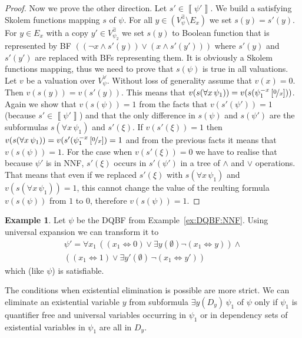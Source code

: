 \documentclass[
  digital, %
  color,
  twoside, %
  table,   %
  nolof,     %
  nolot,     %
]{fithesis3}
\theoremstyle{definition}
\newtheorem{example}{Example}
\theoremstyle{remark}
\newcommand{\seman}[1]{\left\llbracket {#1} \right\rrbracket}
\newcommand{\substitute}[2]{\left[ \nicefrac{#2}{#1} \right]}
\newcommand{\evars}[1]{V_{#1}^{\exists}}
\newcommand{\uvars}[1]{V_{#1}^{\forall}}
\newcommand{\lequal}{\Leftrightarrow}
\newcommand{\itholds}{\,}
\begin{document}
\begin{proof}
  Now we prove the other direction. Let $s' \in \seman{\psi'}$. We build a satisfying Skolem functions mapping $s$ of $\psi$. For all $y \in (\evars{\psi} \setminus E_x)$ we set $s(y) = s'(y)$. For $y \in E_x$ with a copy $y' \in \evars{\psi_2}$ we set $s(y)$ to Boolean function that is represented by BF $((\neg x \land s'(y)) \lor (x \land s'(y')))$ where $s'(y)$ and $s'(y')$ are replaced with BFs representing them. It is obviously a Skolem functions mapping, thus we need to prove that $s(\psi)$ is true in all valuations. Let $v$ be a valuation over $\uvars{\psi}$. Without loss of generality assume that $v(x) = 0$. Then $v(s(y)) = v(s'(y))$. This means that $v(s(\forall x \itholds \psi_1)) = v(s(\psi_1^{-x}\substitute{x}{0}))$. Again we show that $v(s(\psi)) = 1$ from the facts that $v(s'(\psi')) = 1$ (because $s' \in \seman{\psi'}$) and that the only difference in $s(\psi)$ and $s(\psi')$ are the subformulas $s(\forall x\itholds\psi_1)$ and $s'(\xi)$. If $v(s'(\xi)) = 1$ then $v(s(\forall x \itholds \psi_1)) = v(s'(\psi_1^{-x}\substitute{x}{0}) = 1$ and from the previous facts it means that $v(s(\psi)) = 1$. For the case when $v(s'(\xi)) = 0$ we have to realise that because $\psi'$ is in NNF, $s'(\xi)$ occurs in $s'(\psi')$ in a tree of ${\land}$ and ${\lor}$ operations. That means that even if we replaced $s'(\xi)$ with $s(\forall x \itholds \psi_1)$ and $v(s(\forall x \itholds \psi_1)) = 1$, this cannot change the value of the reulting formula $v(s(\psi))$ from $1$ to $0$, therefore $v(s(\psi)) = 1$.
\end{proof}
\begin{example}
Let $\psi$ be the DQBF from Example~\ref{ex:DQBF:NNF}. Using universal expansion we can transform it to
\begin{multline*}
    \psi' = \forall x_1 \itholds ((x_1 \lequal 0) \lor \exists y (\emptyset) \neg(x_1 \lequal y)) \land {}\\
    ((x_1 \lequal 1) \lor \exists y' (\emptyset)\itholds\neg(x_1 \lequal y'))
\end{multline*}
which (like $\psi$) is satisfiable.
\end{example}

The conditions when existential elimination is possible are more strict. We can eliminate an existential variable $y$ from subformula $\exists y (D_y) \itholds \psi_1$ of $\psi$ only if $\psi_1$ is quantifier free and universal variables occurring in $\psi_1$ or in dependency sets of existential variables in $\psi_1$ are all in $D_y$.
\end{document}
